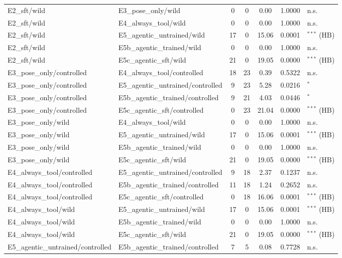 \begin{table}[t]
\begin{tabular}{llccccl}
E2\_sft/wild & E3\_pose\_only/wild & 0 & 0 & 0.00 & 1.0000 & n.s. \\
E2\_sft/wild & E4\_always\_tool/wild & 0 & 0 & 0.00 & 1.0000 & n.s. \\
E2\_sft/wild & E5\_agentic\_untrained/wild & 17 & 0 & 15.06 & 0.0001 & $^{***}$ (HB) \\
E2\_sft/wild & E5b\_agentic\_trained/wild & 0 & 0 & 0.00 & 1.0000 & n.s. \\
E2\_sft/wild & E5c\_agentic\_sft/wild & 21 & 0 & 19.05 & 0.0000 & $^{***}$ (HB) \\
E3\_pose\_only/controlled & E4\_always\_tool/controlled & 18 & 23 & 0.39 & 0.5322 & n.s. \\
E3\_pose\_only/controlled & E5\_agentic\_untrained/controlled & 9 & 23 & 5.28 & 0.0216 & $^{*}$ \\
E3\_pose\_only/controlled & E5b\_agentic\_trained/controlled & 9 & 21 & 4.03 & 0.0446 & $^{*}$ \\
E3\_pose\_only/controlled & E5c\_agentic\_sft/controlled & 0 & 23 & 21.04 & 0.0000 & $^{***}$ (HB) \\
E3\_pose\_only/wild & E4\_always\_tool/wild & 0 & 0 & 0.00 & 1.0000 & n.s. \\
E3\_pose\_only/wild & E5\_agentic\_untrained/wild & 17 & 0 & 15.06 & 0.0001 & $^{***}$ (HB) \\
E3\_pose\_only/wild & E5b\_agentic\_trained/wild & 0 & 0 & 0.00 & 1.0000 & n.s. \\
E3\_pose\_only/wild & E5c\_agentic\_sft/wild & 21 & 0 & 19.05 & 0.0000 & $^{***}$ (HB) \\
E4\_always\_tool/controlled & E5\_agentic\_untrained/controlled & 9 & 18 & 2.37 & 0.1237 & n.s. \\
E4\_always\_tool/controlled & E5b\_agentic\_trained/controlled & 11 & 18 & 1.24 & 0.2652 & n.s. \\
E4\_always\_tool/controlled & E5c\_agentic\_sft/controlled & 0 & 18 & 16.06 & 0.0001 & $^{***}$ (HB) \\
E4\_always\_tool/wild & E5\_agentic\_untrained/wild & 17 & 0 & 15.06 & 0.0001 & $^{***}$ (HB) \\
E4\_always\_tool/wild & E5b\_agentic\_trained/wild & 0 & 0 & 0.00 & 1.0000 & n.s. \\
E4\_always\_tool/wild & E5c\_agentic\_sft/wild & 21 & 0 & 19.05 & 0.0000 & $^{***}$ (HB) \\
E5\_agentic\_untrained/controlled & E5b\_agentic\_trained/controlled & 7 & 5 & 0.08 & 0.7728 & n.s. \\

\end{tabular}
\end{table}
